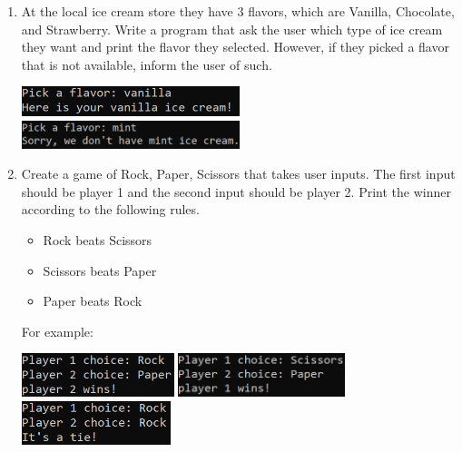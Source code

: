 \documentclass{article}
\begin{document}
\begin{enumerate}
\begin{minipage}{.45\textwidth}
		\end{minipage}




	\item 
		At the local ice cream store they have 3 flavors, which are Vanilla, Chocolate, and Strawberry.  
		Write a program that ask the user which type of ice cream they want and print the flavor they 
		selected.  However, if they picked a flavor that is not available, inform the user of such.
	
		\hfill 
		\includegraphics[width = 2.5in]{./imgs/iceCreamFlavors1.PNG} \hfill 
		\includegraphics[width = 2.5in]{./imgs/iceCreamFlavors2.PNG} \hfill \ 


	\item 
		Create a game of Rock, Paper, Scissors that takes user inputs.  
		The first input should be player 1 and the second 
		input should be player 2.  Print the winner according to the following rules. 
		\begin{itemize}
			\item Rock beats Scissors
			\item Scissors beats Paper
			\item Paper beats Rock
		\end{itemize}		
		For example:

		\hfill 
		\includegraphics[height = 0.5in]{./imgs/RockPaperScissors1.PNG} \hfill 
		\includegraphics[height = 0.5in]{./imgs/RockPaperScissors2.PNG} \hfill  
		\includegraphics[height = 0.5in]{./imgs/RockPaperScissors3.PNG} \hfill \ 



\end{enumerate}
\end{document}
